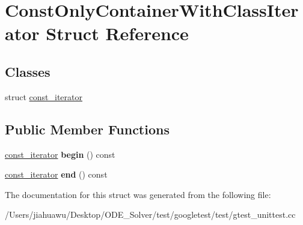 \hypertarget{struct_const_only_container_with_class_iterator}{}\section{Const\+Only\+Container\+With\+Class\+Iterator Struct Reference}
\label{struct_const_only_container_with_class_iterator}
\subsection*{Classes}
\begin{DoxyCompactItemize}
\item 
struct \mbox{\hyperlink{struct_const_only_container_with_class_iterator_1_1const__iterator}{const\+\_\+iterator}}
\end{DoxyCompactItemize}
\subsection*{Public Member Functions}
\begin{DoxyCompactItemize}
\item 
\mbox{\label{struct_const_only_container_with_class_iterator_a30be5262acd17c34d19b19d560ebd541}} 
\mbox{\hyperlink{struct_const_only_container_with_class_iterator_1_1const__iterator}{const\+\_\+iterator}} {\bfseries begin} () const
\item 
\mbox{\label{struct_const_only_container_with_class_iterator_a3d6e17f17eecd7b1ef02afc9a75a0bde}} 
\mbox{\hyperlink{struct_const_only_container_with_class_iterator_1_1const__iterator}{const\+\_\+iterator}} {\bfseries end} () const
\end{DoxyCompactItemize}


The documentation for this struct was generated from the following file\+:\begin{DoxyCompactItemize}
\item 
/\+Users/jiahuawu/\+Desktop/\+O\+D\+E\+\_\+\+Solver/test/googletest/test/gtest\+\_\+unittest.\+cc\end{DoxyCompactItemize}
